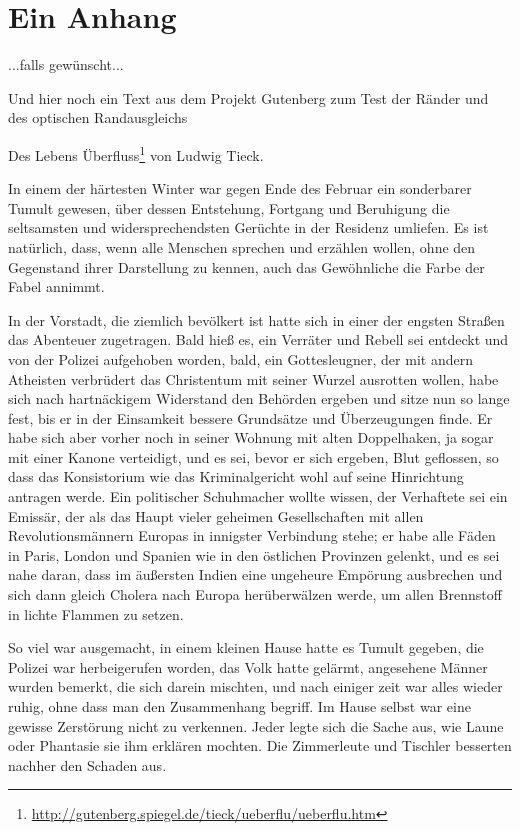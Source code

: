 \chapter{Ein Anhang}
...falls gewünscht...

Und hier noch ein Text aus dem Projekt Gutenberg zum Test der Ränder und des optischen Randausgleichs

Des Lebens Überfluss\footnote{\url{http://gutenberg.spiegel.de/tieck/ueberflu/ueberflu.htm}} von Ludwig Tieck.

In einem der härtesten Winter war gegen Ende des Februar ein sonderbarer Tumult gewesen, über dessen Entstehung, Fortgang und Beruhigung die seltsamsten und widersprechendsten Gerüchte in der Residenz umliefen. Es ist natürlich, dass, wenn alle Menschen sprechen und erzählen wollen, ohne den Gegenstand ihrer Darstellung zu kennen, auch das Gewöhnliche die Farbe der Fabel annimmt.

In der Vorstadt, die ziemlich bevölkert ist hatte sich in einer der engsten Straßen das Abenteuer zugetragen. Bald hieß es, ein Verräter und Rebell sei entdeckt und von der Polizei aufgehoben worden, bald, ein Gottesleugner, der mit andern Atheisten verbrüdert das Christentum mit seiner Wurzel ausrotten wollen, habe sich nach hartnäckigem Widerstand den Behörden ergeben und sitze nun so lange fest, bis er in der Einsamkeit bessere Grundsätze und Überzeugungen finde. Er habe sich aber vorher noch in seiner Wohnung mit alten Doppelhaken, ja sogar mit einer Kanone verteidigt, und es sei, bevor er sich ergeben, Blut geflossen, so dass das Konsistorium wie das Kriminalgericht wohl auf seine Hinrichtung antragen werde. Ein politischer Schuhmacher wollte wissen, der Verhaftete sei ein Emissär, der als das Haupt vieler geheimen Gesellschaften mit allen Revolutionsmännern Europas in innigster Verbindung stehe; er habe alle Fäden in Paris, London und Spanien wie in den östlichen Provinzen gelenkt, und es sei nahe daran, dass im äußersten Indien eine ungeheure Empörung ausbrechen und sich dann gleich Cholera nach Europa herüberwälzen werde, um allen Brennstoff in lichte Flammen zu setzen.

So viel war ausgemacht, in einem kleinen Hause hatte es Tumult gegeben, die Polizei war herbeigerufen worden, das Volk hatte gelärmt, angesehene Männer wurden bemerkt, die sich darein mischten, und nach einiger zeit war alles wieder ruhig, ohne dass man den Zusammenhang begriff. Im Hause selbst war eine gewisse Zerstörung nicht zu verkennen. Jeder legte sich die Sache aus, wie Laune oder Phantasie sie ihm erklären mochten. Die Zimmerleute und Tischler besserten nachher den Schaden aus.

